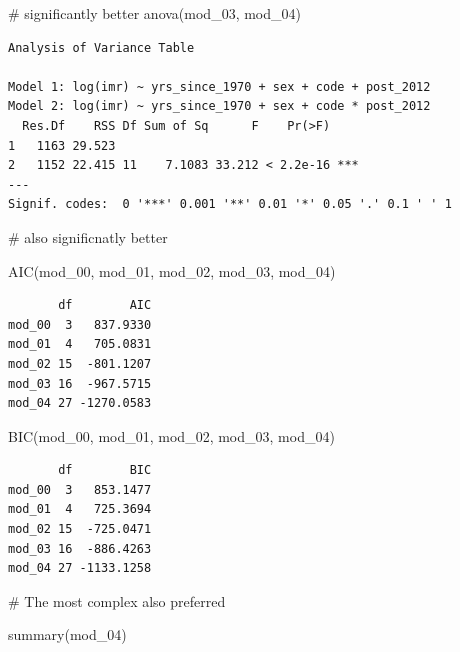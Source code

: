 \documentclass[
  letterpaper,
  DIV=11,
  numbers=noendperiod]{scrartcl}
\newenvironment{Shaded}{\begin{snugshade}}{\end{snugshade}}
\newcommand{\CommentTok}[1]{\textcolor[rgb]{0.37,0.37,0.37}{#1}}
\newcommand{\FunctionTok}[1]{\textcolor[rgb]{0.28,0.35,0.67}{#1}}
\newcommand{\NormalTok}[1]{\textcolor[rgb]{0.00,0.23,0.31}{#1}}
\begin{document}
\begin{Shaded}
\begin{Highlighting}[]
\CommentTok{\# significantly better}
\FunctionTok{anova}\NormalTok{(mod\_03, mod\_04)}
\end{Highlighting}
\end{Shaded}

\begin{verbatim}
Analysis of Variance Table

Model 1: log(imr) ~ yrs_since_1970 + sex + code + post_2012
Model 2: log(imr) ~ yrs_since_1970 + sex + code * post_2012
  Res.Df    RSS Df Sum of Sq      F    Pr(>F)    
1   1163 29.523                                  
2   1152 22.415 11    7.1083 33.212 < 2.2e-16 ***
---
Signif. codes:  0 '***' 0.001 '**' 0.01 '*' 0.05 '.' 0.1 ' ' 1
\end{verbatim}

\begin{Shaded}
\begin{Highlighting}[]
\CommentTok{\# also significnatly better }

\FunctionTok{AIC}\NormalTok{(mod\_00, mod\_01, mod\_02, mod\_03, mod\_04)}
\end{Highlighting}
\end{Shaded}

\begin{verbatim}
       df        AIC
mod_00  3   837.9330
mod_01  4   705.0831
mod_02 15  -801.1207
mod_03 16  -967.5715
mod_04 27 -1270.0583
\end{verbatim}

\begin{Shaded}
\begin{Highlighting}[]
\FunctionTok{BIC}\NormalTok{(mod\_00, mod\_01, mod\_02, mod\_03, mod\_04)}
\end{Highlighting}
\end{Shaded}

\begin{verbatim}
       df        BIC
mod_00  3   853.1477
mod_01  4   725.3694
mod_02 15  -725.0471
mod_03 16  -886.4263
mod_04 27 -1133.1258
\end{verbatim}

\begin{Shaded}
\begin{Highlighting}[]
\CommentTok{\# The most complex also preferred}
\end{Highlighting}
\end{Shaded}

\begin{Shaded}
\begin{Highlighting}[]
\FunctionTok{summary}\NormalTok{(mod\_04)}
\end{Highlighting}
\end{Shaded}
\end{document}

